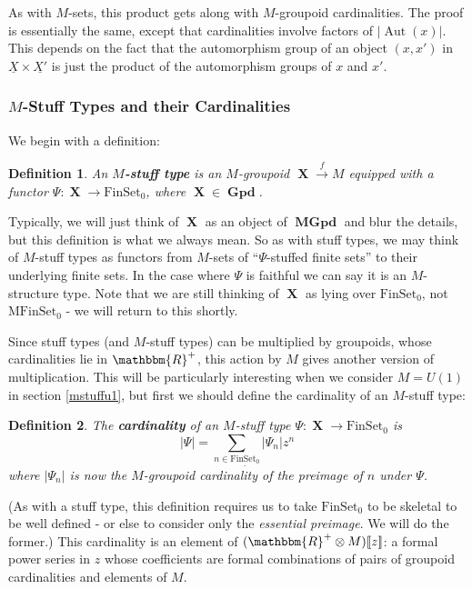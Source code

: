 \documentclass{amsart} \usepackage{amsmath,amssymb,bbm}
\newcommand{\opname}[1]{\operatorname{#1}}
\newtheorem{definition}{Definition}
\newcommand{\catname}[1]{\boldsymbol{\opname{{#1}}}}
\newcommand{\FSN}{\catname{FinSet_0}}
\newcommand{\MFSN}{\catname{MFinSet_0}}
\newcommand{\MRz}{(\mathbbm{R}^+ \otimes M)[\![z]\!]}
\newcommand{\rightarrowlim}{\mathop{\rightarrow}\limits}
\begin{document}
As with $M$-sets, this product gets along with $M$-groupoid
cardinalities.  The proof is essentially the same, except that
cardinalities involve factors of $|\opname{Aut}(x)|$.  This depends on
the fact that the automorphism group of an object $(x,x')$ in
$\underline{X} \times \underline{X'}$ is just the product of the
automorphism groups of $x$ and $x'$.

\subsubsection{$M$-Stuff Types and their Cardinalities}

We begin with a definition:

\begin{definition} An \textbf{$M$-stuff type} is an $M$-groupoid
$\catname{X} \rightarrowlim^{f} M$ equipped with a functor $\Psi :
\catname{X} \rightarrow \FSN$, where $\catname{X} \in \catname{Gpd}$.
\end{definition}

Typically, we will just think of $\catname{X}$ as an object of $\catname{MGpd}$
and blur the details, but this definition is what we always mean.  So
as with stuff types, we may think of $M$-stuff types as functors from
$M$-sets of ``$\Psi$-stuffed finite sets'' to their underlying finite
sets.  In the case where $\Psi$ is faithful we can say it is an
$M$-structure type.  Note that we are still thinking of $\catname{X}$
as lying over $\FSN$, not $\MFSN$ - we will return to this shortly.

Since stuff types (and $M$-stuff types) can be multiplied by
groupoids, whose cardinalities lie in $\mathbbm{R}^+$, this action by
$M$ gives another version of multiplication.  This will be
particularly interesting when we consider $M = U(1)$ in section
\ref{mstuffu1}, but first we should define the cardinality of an
$M$-stuff type:

\begin{definition}
  The \textbf{cardinality} of an $M$-stuff type $\Psi : \catname{X}
  \rightarrow \FSN$ is \begin{equation}
    |\Psi| = \sum_{n \in \underline{\FSN}} |\Psi_n|z^n
  \end{equation}
  where $|\Psi_n|$ is now the $M$-groupoid cardinality of the preimage of
  $n$ under $\Psi$.
\end{definition}

(As with a stuff type, this definition requires us to take $\FSN$ to
be skeletal to be well defined - or else to consider only the
\textit{essential preimage}.  We will do the former.)  This
cardinality is an element of $\MRz$: a formal power series in $z$
whose coefficients are formal combinations of pairs of groupoid
cardinalities and elements of $M$.
\end{document}
